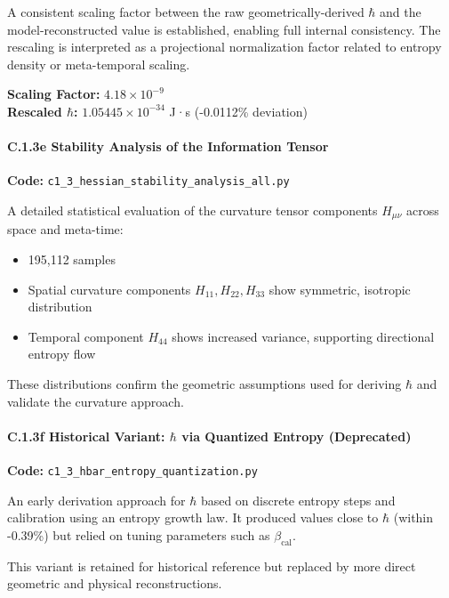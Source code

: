 \documentclass[10.5pt,a4paper]{article}
\begin{document}
A consistent scaling factor between the raw geometrically-derived \( \hbar \) and the model-reconstructed value is established, enabling full internal consistency. The rescaling is interpreted as a projectional normalization factor related to entropy density or meta-temporal scaling.

\medskip

\noindent\textbf{Scaling Factor:} \(4.18 \times 10^{-9}\)\\
\textbf{Rescaled \(\hbar\):} \(1.05445 \times 10^{-34}\) J·s (-0.0112\% deviation)

\paragraph{C.1.3e Stability Analysis of the Information Tensor}

\noindent\textbf{Code:} \texttt{c1\_3\_hessian\_stability\_analysis\_all.py}

A detailed statistical evaluation of the curvature tensor components \( H_{\mu\nu} \) across space and meta-time:

\begin{itemize}
    \item 195,112 samples
    \item Spatial curvature components \( H_{11}, H_{22}, H_{33} \) show symmetric, isotropic distribution
    \item Temporal component \( H_{44} \) shows increased variance, supporting directional entropy flow
\end{itemize}

These distributions confirm the geometric assumptions used for deriving \( \hbar \) and validate the curvature approach.

\paragraph{C.1.3f Historical Variant: \(\hbar\) via Quantized Entropy (Deprecated)}

\noindent\textbf{Code:} \texttt{c1\_3\_hbar\_entropy\_quantization.py}

An early derivation approach for \( \hbar \) based on discrete entropy steps and calibration using an entropy growth law. It produced values close to \( \hbar \) (within -0.39\%) but relied on tuning parameters such as \( \beta_{\text{cal}} \).

This variant is retained for historical reference but replaced by more direct geometric and physical reconstructions.
\end{document}

